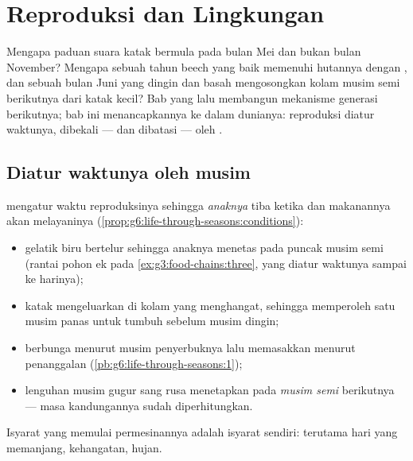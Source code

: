 \chapter{Reproduksi dan Lingkungan}\label{ch:g8:reproduction-and-environment}

Mengapa paduan suara katak bermula pada bulan Mei dan bukan bulan
November? Mengapa sebuah tahun beech yang baik memenuhi hutannya
dengan , dan sebuah bulan Juni yang dingin dan basah
mengosongkan kolam musim semi berikutnya dari katak kecil? Bab yang
lalu membangun mekanisme generasi berikutnya; bab ini menancapkannya
ke dalam dunianya: reproduksi diatur waktunya, dibekali --- dan
dibatasi --- oleh .

\section{Diatur waktunya oleh musim}

\begin{proposition}\label{prop:g8:reproduction-and-environment:timing}
 mengatur waktu reproduksinya sehingga \emph{anaknya} tiba
ketika  dan makanannya akan melayaninya
(\cref{prop:g6:life-through-seasons:conditions}):
\begin{itemize}
  \item gelatik biru bertelur sehingga anaknya menetas pada puncak
         musim semi (rantai pohon ek pada
        \cref{ex:g3:food-chains:three}, yang diatur waktunya sampai ke
        harinya);
  \item katak mengeluarkan  di kolam yang menghangat,
        sehingga  memperoleh satu musim panas untuk tumbuh
        sebelum musim dingin;
  \item {} berbunga menurut musim penyerbuknya lalu memasakkan
         menurut penanggalan 
        (\cref{pb:g6:life-through-seasons:1});
  \item lenguhan musim gugur sang rusa  menetapkan 
        pada \emph{musim semi} berikutnya --- masa kandungannya sudah
        diperhitungkan.
\end{itemize}
Isyarat yang memulai permesinannya adalah isyarat 
sendiri: terutama hari yang memanjang, kehangatan, hujan.
\end{proposition}
\admitted

